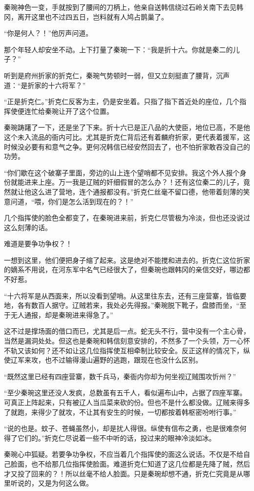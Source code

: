 秦琬神色一变，手就按到了腰间的刀柄上，他亲自送韩信绕过石岭关南下去见韩冈，离开这里也不过四五日，岂料就有人鸠占鹊巢了。

“你是何人？！”他厉声问道。

那个年轻人却安坐不动。上下打量了秦琬一下：“我是折十六。你就是秦二的儿子？”

听到是府州折家的折克仁，秦琬气势顿时一弱，但又立刻挺直了腰背，沉声道：“是折家的十六将军？”

“正是折克仁。”折克仁反客为主，仍是安坐着。只指了指下首近处的座位，几个指挥使便连忙给秦琬让开了这个位置。

秦琬踌躇了一下，还是坐了下来。折十六已是正八品的大使臣，地位已高，不是他这个未入流品的衙内可比。尤其是折克仁背后还有着麟府折家，更代表着援军，这时候没必要有和意气之争。更何况韩信已经安然回去了，也不怕折家敢吞没自己的功劳。

“你们歇在这个破寨子里面，旁边的山上连个望哨都不见安排。我这个外人报个身份就能进来上座。万一我是辽贼的奸细假冒的怎么办？！还有这位秦二的儿子，竟然就让他这么进了营地，连个通报都没有。”折克仁丝毫不留口德，他带着刻薄的笑意问道，“喂，你们是怎么活到现在的？！”

几个指挥使的脸色全都变了，在秦琬进来前，折克仁尽管极为冷淡，但也还没说过这么刻薄的话。

难道是要争功争权？！

一想到这里，他们便把身子缩了起来。这是绝对不能搅和进去的。折克仁这位折家的嫡系不用说，在河东军中名气已经很大了，但秦琬也跟韩冈的亲信交好，哪边都不好惹。

“十六将军是从西面来，所以没看到望哨。从这里往东去，还有三座营寨，皆临要地，各有数百人据守。辽贼若来，我处必先得报。”秦琬脱下靴子，盘膝而坐，“至于无人通报，却是秦琬进来得急了。”

这不过是撑场面的借口而已，尤其是后一点。蛇无头不行，营中没有一个主心骨，当然是漏洞处处。但这也是秦琬和韩信刻意安排的，不然多了一个头领，万一心怀不轨又该如何？还不如让这几位指挥使互相牵制比较安全。反正这样的情况下，纵使辽军来攻，也不过输得漫山遍野的逃跑，跟现在也没什么区别。

“既然这里已经有四座营寨，数千兵马，秦衙内你却为何坐视辽贼围攻忻州？”

“至少秦琬这里还没人发疯，总数虽有五千人，看似遍布山中，占据了四座军寨。可真正上阵起来，只有被辽人当瓜菜来砍的份。但也不是什么都没做。辽贼来得多了就跑，来得少了就攻，不让其有安生的时候，一切都按着韩枢密吩咐行事。”

“说的也是。蚊子、苍蝇虽然小，却是扰人得很。纵使有信布之勇，也是很难奈何得了它们的。”折克仁尽说着一些不中听的话，投过来的眼神冷淡如冰。

秦琬心中狐疑。若要争功争权，不应当着几个指挥使的面这么说话。不仅是不给自己脸面，也不给那几位指挥使脸面。难道折克仁知道了这几位都是先降了贼，然后才又投了回来的？！所以丝毫不给人脸面。只是秦琬却想不通，折克仁究竟是从哪里听说的，又是为何这么做。

